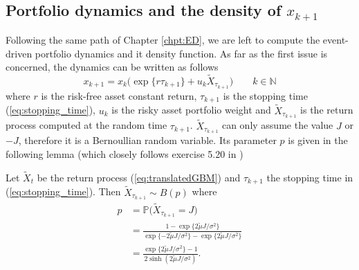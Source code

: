 \subsection{Portfolio dynamics and the density of $x_{k+1}$}
Following the same path of Chapter \ref{chpt:ED}, we are left to compute the event-driven portfolio dynamics and it density function. As far as the first issue is concerned, the dynamics can be written as follows
\begin{equation}\label{eq:GBM_portfolio_dynamics}
\boxed{x_{k+1}=x_k\big(\exp\{r\tau_{k+1}\} + u_k\widetilde{X}_{\tau_{k+1}}\big)} \qquad k \in \mathbb{N}
\end{equation}
where $r$ is the risk-free asset constant return, $\tau_{k+1}$ is the stopping time (\ref{eq:stopping_time}), $u_k$ is the risky asset portfolio weight and $\widetilde{X}_{\tau_{k+1}}$ is the return process computed at the random time $\tau_{k+1}$. $\widetilde{X}_{\tau_{k+1}}$ can only assume the value $J$ or $-J$, therefore it is a Bernoullian random variable. Its parameter $p$ is given in the following lemma (which closely follows exercise 5.20 in \cite{baldi2017})
\begin{lemma}\label{lemma:probability_positive_jump}
	Let $\widetilde{X}_t$ be the return process (\ref{eq:translatedGBM}) and $\tau_{k+1}$ the stopping time in (\ref{eq:stopping_time}). Then $\widetilde{X}_{\tau_{k+1}} \sim B(p)$ where 
	\begin{align}
	p &= \mathbb{P}\Big(\widetilde{X}_{\tau_{k+1}}=J\Big)\\[2ex]\nonumber
	&=\frac{1-\exp\{2\widetilde{\mu}J/\sigma^2\}}{\exp\{-2\widetilde{\mu}J/\sigma^2\} - \exp\{2\widetilde{\mu}J/\sigma^2\}} \\[2ex]\nonumber
	& = \frac{\exp\{2\widetilde{\mu}J/\sigma^2\}-1}{2\sinh(2\widetilde{\mu}J/\sigma^2)}.
	\end{align}
\end{lemma}
